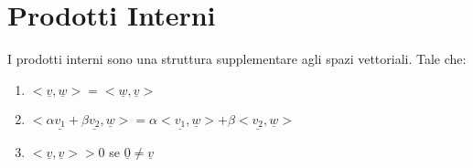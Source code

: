 \section{Prodotti Interni} %
I prodotti interni sono una struttura supplementare agli spazi vettoriali.
\]
Tale che:
\begin{enumerate}
	\item $<\underline{v},\underline{w}> = <\underline{w},\underline{v}>$
	\item $<\alpha \underline{v_1} + \beta \underline{v_2},\underline{w}> =\alpha <\underline{v_1},\underline{w}> + \beta <\underline{v_2},\underline{w}> $
	\item $<\underline{v},\underline{v}> > 0$ se $\underline{0}\neq \underline{v}$
\end{enumerate}